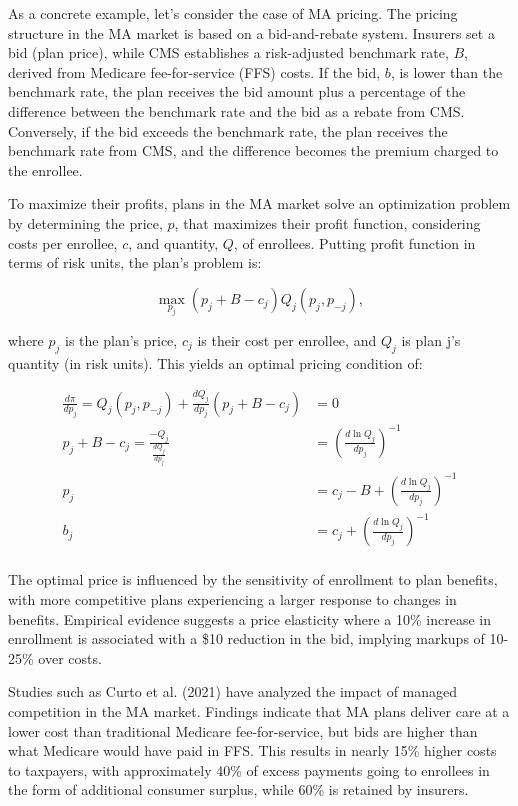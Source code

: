\documentclass[
  letterpaper,
  DIV=11,
  numbers=noendperiod]{scrreport}
\theoremstyle{definition}
\theoremstyle{remark}
\begin{document}
As a concrete example, let's consider the case of MA pricing. The
pricing structure in the MA market is based on a bid-and-rebate system.
Insurers set a bid (plan price), while CMS establishes a risk-adjusted
benchmark rate, \(B\), derived from Medicare fee-for-service (FFS)
costs. If the bid, \(b\), is lower than the benchmark rate, the plan
receives the bid amount plus a percentage of the difference between the
benchmark rate and the bid as a rebate from CMS. Conversely, if the bid
exceeds the benchmark rate, the plan receives the benchmark rate from
CMS, and the difference becomes the premium charged to the enrollee.

To maximize their profits, plans in the MA market solve an optimization
problem by determining the price, \(p\), that maximizes their profit
function, considering costs per enrollee, \(c\), and quantity, \(Q\), of
enrollees. Putting profit function in terms of risk units, the plan's
problem is:

\[\max_{p_{j}} \left(p_{j} + B - c_{j} \right) Q_{j}(p_{j}, p_{-j}),\]

where \(p_{j}\) is the plan's price, \(c_{j}\) is their cost per
enrollee, and \(Q_{j}\) is plan j's quantity (in risk units). This
yields an optimal pricing condition of:

\[\begin{align}
\frac{d \pi}{d p_{j}} = Q_{j}(p_{j}, p_{-j}) + \frac{d Q_{j}}{d p_{j}} ( p_{j} + B - c_{j}) &= 0 \\
  p_{j} + B - c_{j} = \frac{ - Q_{j} }{ \frac{d Q_{j}}{d p_{j}}} &= \left(\frac{d \ln Q_{j}}{d p_{j}}\right)^{-1} \\
  p_{j}  &= c_{j} - B + \left(\frac{d \ln Q_{j}}{d p_{j}}\right)^{-1} \\
  b_{j}  &= c_{j} + \left(\frac{d \ln Q_{j}}{d p_{j}}\right)^{-1} \\
\end{align}\]

The optimal price is influenced by the sensitivity of enrollment to plan
benefits, with more competitive plans experiencing a larger response to
changes in benefits. Empirical evidence suggests a price elasticity
where a 10\% increase in enrollment is associated with a \$10 reduction
in the bid, implying markups of 10-25\% over costs.

Studies such as Curto et al. (2021) have analyzed the impact of managed
competition in the MA market. Findings indicate that MA plans deliver
care at a lower cost than traditional Medicare fee-for-service, but bids
are higher than what Medicare would have paid in FFS. This results in
nearly 15\% higher costs to taxpayers, with approximately 40\% of excess
payments going to enrollees in the form of additional consumer surplus,
while 60\% is retained by insurers.
\end{document}
